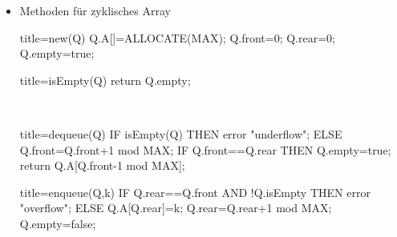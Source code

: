 \documentclass[
    12pt,
    a4paper,
    ngerman,
    color=3b,%
    marginpar=false,
    colorback=false,
    leqno,
]{tudaexercise}
\begin{document}
\begin{itemize}
\begin{itemize}
              \item Methoden für zyklisches Array\\
                    \begin{minipage}[t]{.45\textwidth}
                        \begin{ccode}[autogobble]{title={new(Q)}}
                            Q.A[]=ALLOCATE(MAX);
                            Q.front=0;
                            Q.rear=0;
                            Q.empty=true;
                        \end{ccode}
                    \end{minipage}
                    \begin{minipage}[t]{.45\textwidth}
                        \begin{ccode}[autogobble]{title={isEmpty(Q)}}
                            return Q.empty;
                        \end{ccode}
                    \end{minipage}
                    \\
                    \begin{minipage}[t]{.45\textwidth}
                        \begin{ccode}[autogobble]{title={dequeue(Q)}}
                            IF isEmpty(Q) THEN
                                error "underflow";
                            ELSE
                                Q.front=Q.front+1 mod MAX;
                                IF Q.front==Q.rear THEN
                                    Q.empty=true;
                                return Q.A[Q.front-1 mod MAX];
                        \end{ccode}
                    \end{minipage}
                    \begin{minipage}[t]{.45\textwidth}
                        \begin{ccode}[autogobble]{title={enqueue(Q,k)}}
                            IF Q.rear==Q.front AND !Q.isEmpty
                            THEN error "overflow";
                            ELSE
                                Q.A[Q.rear]=k;
                                Q.rear=Q.rear+1 mod MAX;
                                Q.empty=false;
                        \end{ccode}
                    \end{minipage}
          \end{itemize}


\end{itemize}
\end{document}

